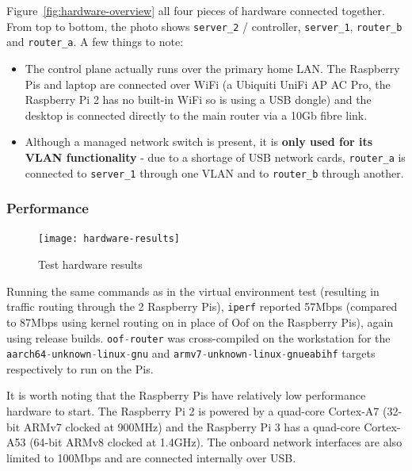 \documentclass[a4paper]{article}
\numberwithin{figure}{section}
\numberwithin{table}{section}
\newcommand{\mi}{\mintinline}
\begin{document}
Figure~\ref{fig:hardware-overview} all four pieces of hardware connected together. From top to bottom, the photo shows \mi{c}{server_2} / controller, \mi{c}{server_1}, \mi{c}{router_b} and \mi{c}{router_a}. A few things to note:
\begin{itemize}
	\item The control plane actually runs over the primary home LAN. The Raspberry Pis and laptop are connected over WiFi (a Ubiquiti UniFi AP AC Pro, the Raspberry Pi 2 has no built-in WiFi so is using a USB dongle) and the desktop is connected directly to the main router via a 10Gb fibre link.
	\item Although a managed network switch is present, it is \textbf{only used for its VLAN functionality} - due to a shortage of USB network cards, \mi{c}{router_a} is connected to \mi{c}{server_1} through one VLAN and to \mi{c}{router_b} through another.
\end{itemize}

\subsubsection{Performance}
\begin{figure}[h!]
	\centering
	\texttt{[image: hardware-results]}
	\caption{Test hardware results}
	\label{fig:hardware-results}
\end{figure}

Running the same commands as in the virtual environment test (resulting in traffic routing through the 2 Raspberry Pis), \mi{c}{iperf} reported 57Mbps (compared to 87Mbps using kernel routing on in place of Oof on the Raspberry Pis), again using release builds. \mi{c}{oof-router} was cross-compiled on the workstation for the \mi{c}{aarch64-unknown-linux-gnu} and \mi{c}{armv7-unknown-linux-gnueabihf} targets respectively to run on the Pis.

It is worth noting that the Raspberry Pis have relatively low performance hardware to start. The Raspberry Pi 2 is powered by a quad-core Cortex-A7 (32-bit ARMv7 clocked at 900MHz) and the Raspberry Pi 3 has a quad-core Cortex-A53 (64-bit ARMv8 clocked at 1.4GHz). The onboard network interfaces are also limited to 100Mbps and are connected internally over USB.

\newpage
\end{document}
